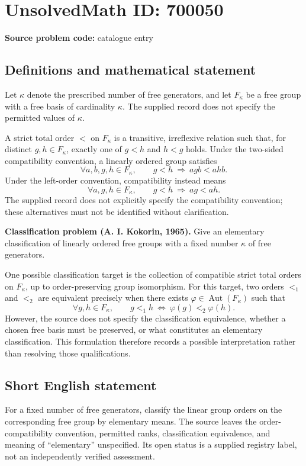 \documentclass[11pt]{article}
\begin{document}
\section*{UnsolvedMath ID: 700050}
\textbf{Source problem code:} catalogue entry
\subsection{Definitions and mathematical statement}
Let \(\kappa\) denote the prescribed number of free generators, and let \(F_\kappa\) be a free group with a free basis of cardinality \(\kappa\). The supplied record does not specify the permitted values of \(\kappa\).

A strict total order \(<\) on \(F_\kappa\) is a transitive, irreflexive relation such that, for distinct \(g,h\in F_\kappa\), exactly one of \(g<h\) and \(h<g\) holds. Under the two-sided compatibility convention, a linearly ordered group satisfies
\[
\forall a,b,g,h\in F_\kappa,\qquad g<h\ \Longrightarrow\ agb<ahb.
\]
Under the left-order convention, compatibility instead means
\[
\forall a,g,h\in F_\kappa,\qquad g<h\ \Longrightarrow\ ag<ah.
\]
The supplied record does not explicitly specify the compatibility convention; these alternatives must not be identified without clarification.

\textbf{Classification problem (A. I. Kokorin, 1965).} Give an elementary classification of linearly ordered free groups with a fixed number \(\kappa\) of free generators.

One possible classification target is the collection of compatible strict total orders on \(F_\kappa\), up to order-preserving group isomorphism. For this target, two orders \(<_1\) and \(<_2\) are equivalent precisely when there exists \(\varphi\in\operatorname{Aut}(F_\kappa)\) such that
\[
\forall g,h\in F_\kappa,\qquad g<_1h\ \Longleftrightarrow\ \varphi(g)<_2\varphi(h).
\]
However, the source does not specify the classification equivalence, whether a chosen free basis must be preserved, or what constitutes an elementary classification. This formulation therefore records a possible interpretation rather than resolving those qualifications.
\subsection{Short English statement}
For a fixed number of free generators, classify the linear group orders on the corresponding free group by elementary means. The source leaves the order-compatibility convention, permitted ranks, classification equivalence, and meaning of ``elementary'' unspecified. Its open status is a supplied registry label, not an independently verified assessment.
\end{document}
